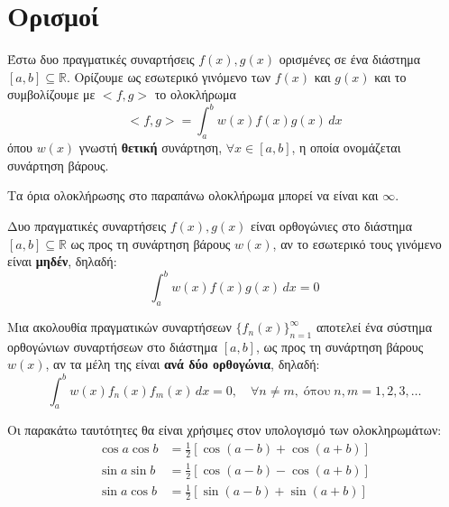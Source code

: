 \documentclass[a4paper,table]{report}
\begin{document}
\begin{center}
  \minibox{\large\bfseries \textcolor{Col1}{Ορθογωνιότητα Συναρτήσεων}}
\end{center}

\vspace{\baselineskip}



\section*{Ορισμοί}

\begin{dfn}
  Έστω δυο πραγματικές συναρτήσεις $ f(x), g(x) $ ορισμένες σε ένα διάστημα 
  $ [a,b] \subseteq \mathbb{R} $. Ορίζουμε ως \textcolor{Col1}{εσωτερικό γινόμενο} 
  των $ f(x) $ και $ g(x) $ και το συμβολίζουμε με $ <f,g> $ το ολοκλήρωμα
  \[
    <f,g> = \int _{a}^{b} w(x) f(x)g(x) \,{dx} 
  \] 
  όπου $ w(x) $ γνωστή \textbf{θετική} συνάρτηση, $ \forall x \in [a,b] $, η οποία 
  ονομάζεται \textcolor{Col1}{συνάρτηση βάρους}.
\end{dfn}

\begin{rem}
  Τα όρια ολοκλήρωσης στο παραπάνω ολοκλήρωμα μπορεί να είναι και $ \infty $.
\end{rem}

\begin{dfn}
  Δυο πραγματικές συναρτήσεις $ f(x), g(x) $ είναι \textcolor{Col1}{ορθογώνιες} 
  στο διάστημα $ [a,b] \subseteq \mathbb{R} $ ως προς τη συνάρτηση βάρους $ w(x) $, 
  αν το εσωτερικό τους γινόμενο είναι \textbf{μηδέν}, δηλαδή:
  \[
    \int _{a}^{b} w(x)f(x)g(x) \,{dx} = 0
  \] 
\end{dfn}

\begin{dfn}
  Μια ακολουθία πραγματικών συναρτήσεων $ \{ f_{n}(x) \}_{n=1}^{\infty} $ αποτελεί 
  ένα \textcolor{Col1}{σύστημα ορθογώνιων συναρτήσεων} στο διάστημα $ [a,b] $, 
  ως προς τη συνάρτηση βάρους $ w(x) $, αν τα μέλη της είναι 
  \textbf{ανά δύο ορθογώνια}, δηλαδή:
  \[
    \int _{a}^{b} w(x) f_{n}(x)f_{m}(x) \,{dx} = 0, \quad \forall n \neq m, \; 
    \text{όπου} \;  n,m = 1,2,3, \ldots
  \] 
\end{dfn}

\begin{rem}
  Οι παρακάτω ταυτότητες θα είναι χρήσιμες στον υπολογισμό των ολοκληρωμάτων:
  \begin{align*}
    \cos{a} \cos{b} &= \frac{1}{2} [\cos{(a-b)} + \cos{(a+b)}] \\ 
    \sin{a} \sin{b} &= \frac{1}{2} [\cos{(a-b)} - \cos{(a+b)}] \\
    \sin{a} \cos{b} &= \frac{1}{2} [\sin{(a-b)} + \sin{(a+b)}]
  \end{align*} 
\end{rem}
\end{document}
